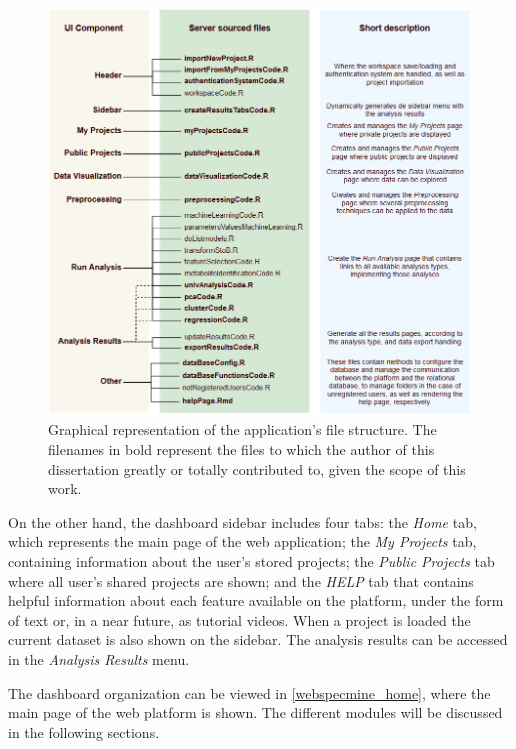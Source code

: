 \begin{figure}[H]
	\centering
	\includegraphics[width=1\linewidth]{Imagens/file_structure}
	\caption{Graphical representation of the application's file structure. The filenames in bold represent the files to which the author of this dissertation greatly or totally contributed to, given the scope of this work.}
	\label{file_structure}
\end{figure}

On the other hand, the dashboard sidebar includes four tabs: the \textit{Home} tab, which represents the main page of the web application; the \textit{My Projects} tab, containing information about the user's stored projects; the \textit{Public Projects} tab where all user's shared projects are shown; and the \textit{HELP} tab that contains helpful information about each feature available on the platform, under the form of text or, in a near future, as tutorial videos. When a project is loaded the current dataset is also shown on the sidebar. The analysis results can be accessed in the \textit{Analysis Results} menu.

The dashboard organization can be viewed in \autoref{webspecmine_home}, where the main page of the web platform is shown. The different modules will be discussed in the following sections. 

